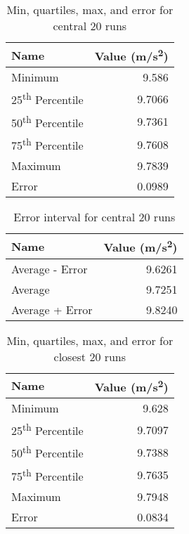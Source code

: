 \begin{table}[ht]
    \centering
    \begin{tabular}{l|r}

        \textbf{Name} & \textbf{Value} (m/s\textsuperscript{2}) \\
        \hline
        Minimum & 9.586 \\
        25\textsuperscript{th} Percentile & 9.7066 \\
        50\textsuperscript{th} Percentile & 9.7361 \\
        75\textsuperscript{th} Percentile & 9.7608 \\
        Maximum & 9.7839 \\
        Error & 0.0989 \\
        \hline
    \end{tabular}
    \caption{Min, quartiles, max, and error for central 20 runs}
    \label{table:01.describe.20.center}
\end{table}
%
\begin{table}[ht]
    \centering
    \begin{tabular}{l|r}
        \textbf{Name} & \textbf{Value} (m/s\textsuperscript{2}) \\
        \hline
        Average - Error & 9.6261 \\
        Average & 9.7251 \\
        Average + Error & 9.8240 \\
        \hline
    \end{tabular}
    \caption{Error interval for central 20 runs}
    \label{table:01.error.20.center}
\end{table}
%
\begin{table}[ht]
    \centering
    \begin{tabular}{l|r}
        \textbf{Name} & \textbf{Value} (m/s\textsuperscript{2}) \\
        \hline
        Minimum & 9.628 \\
        25\textsuperscript{th} Percentile & 9.7097 \\
        50\textsuperscript{th} Percentile & 9.7388 \\
        75\textsuperscript{th} Percentile & 9.7635 \\
        Maximum & 9.7948 \\
        Error & 0.0834 \\
        \hline
    \end{tabular}
    \caption{Min, quartiles, max, and error for closest 20 runs}
    \label{table:01.describe.20.close}
\end{table}
